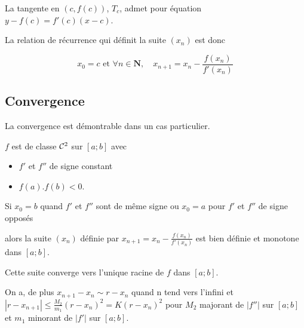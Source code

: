 La tangente en $(c,f(c))$, $T_c$, admet pour équation $y - f(c) = f'(c) (x-c) $.

La relation de récurrence qui définit la suite $(x_n)$ est donc

\[ x_0=c \text{ et  } \forall n \in \mathbf{N}, \quad x_{n+1} = x_n -\frac{f(x_n)}{f'(x_n)} \]
\subsection{Convergence}
La convergence est démontrable dans un cas particulier.
\begin{thm}
$f$ est de classe ${\cal C}^2$ sur $[a; b]$ avec
\begin{itemize}
  \item $f'$ et $f''$ de signe constant
  \item $f(a).f(b) < 0$.
\end{itemize}
Si $x_0 = b$ quand $f'$ et $f''$ sont de même signe ou $x_0 = a$ pour $f'$ et $f''$ de signe opposés 

alors la suite $(x_n)$ définie par
$\displaystyle x_{n+1}=x_n -\frac{f(x_n)}{f'(x_n)}$ est bien définie et monotone dans $[a;b]$.

Cette suite converge vers l'unique racine de $f$ dans $[a;b]$.

On a, de plus $x_{n+1} - x_n \sim r - x_n$ quand n tend vers l'infini
et $\displaystyle |r - x_{n+1}| \le \frac {M_2}{m_1} (r - x_n)^2=K(r - x_n)^2$ pour $M_2$ majorant de $|f''|$ sur $[a;b]$ et $m_1$ minorant de $|f'|$ sur $[a;b]$.
\end{thm}


  
  
